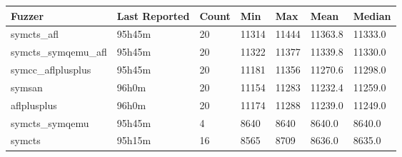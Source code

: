 
\begin{table*}[h]
\centering
\begin{tabular}{|l|l|l|l|l|l|l|}
\hline
\textbf{Fuzzer} & \textbf{Last Reported} & \textbf{Count} & \textbf{Min} & \textbf{Max} & \textbf{Mean} & \textbf{Median} \\
\hline
symcts\_afl        & 95h45m             & 20     & 11314 & 11444 & 11363.8       & 11333.0    \\
symcts\_symqemu\_afl & 95h45m             & 20     & 11322 & 11377 & 11339.8       & 11330.0    \\
symcc\_aflplusplus & 95h45m             & 20     & 11181 & 11356 & 11270.6       & 11298.0    \\
symsan             & 96h0m              & 20     & 11154 & 11283 & 11232.4       & 11259.0    \\
aflplusplus        & 96h0m              & 20     & 11174 & 11288 & 11239.0       & 11249.0    \\
symcts\_symqemu    & 95h45m             & 4      & 8640  & 8640  & 8640.0        & 8640.0     \\
symcts             & 95h15m             & 16     & 8565  & 8709  & 8636.0        & 8635.0     \\
\hline
\end{tabular}
\end{table*}